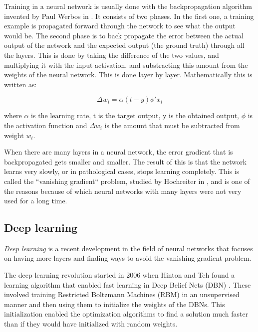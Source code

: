 Training in a neural network is usually done with the backpropagation algorithm invented by Paul Werbos in \cite{werbos1974beyond}. It consists of two phases. In the first one, a training example is propagated forward through the network to see what the output would be. The second phase is to back propagate the error between the actual output of the network and the expected output (the ground truth) through all the layers. This is done by taking the difference of the two values, and multiplying it with the input activation, and substracting this amount from the weights of the neural network. This is done layer by layer. Mathematically this is written as:

\[
 \Delta w_i = \alpha (t - y) \phi' x_i 
\]

where $\alpha$ is the learning rate, t is the target output, y is the obtained output,  $ \phi $ is the activation function and $ \Delta w_i $ is the amount that must be subtracted from weight $ w_i $. 

When there are many layers in a neural network, the error gradient that is backpropagated gets smaller and smaller. The result of this is that the network learns very slowly, or in pathological cases, stops learning completely. This is called the ``vanishing gradient`` problem,  studied by Hochreiter in \cite{hochreiter1998vanishing}, and is one of the reasons because of which neural networks with many layers were not very used for a long time. 

\subsection{Deep learning}

\textit{Deep learning} is a recent development in the field of neural networks that focuses on having more layers and finding ways to avoid the vanishing gradient problem.

The deep learning revolution started in 2006 when Hinton and Teh found a learning algorithm that enabled fast learning in Deep Belief Nets (DBN) \cite{hinton2006fast}. These involved training Restricted Boltzmann Machines (RBM) in an unsupervised manner and then using them to initialize the weights of the DBNs. This initialization enabled the optimization algorithms to find a solution much faster than if they would have initialized with random weights.

